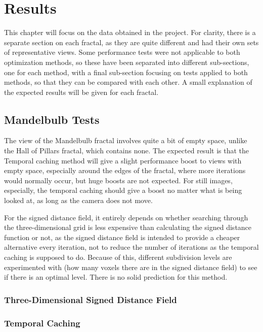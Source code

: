 \chapter{Results}
\label{chapter4}

This chapter will focus on the data obtained in the project. For clarity, there is a separate section on each fractal, as they are quite different and had their own sets of representative views. Some performance tests were not applicable to both optimization methods, so these have been separated into different sub-sections, one for each method, with a final sub-section focusing on tests applied to both methods, so that they can be compared with each other. A small explanation of the expected results will be given for each fractal.

\section{Mandelbulb Tests}

The view of the Mandelbulb fractal involves quite a bit of empty space, unlike the Hall of Pillars fractal, which contains none. The expected result is that the Temporal caching method will give a slight performance boost to views with empty space, especially around the edges of the fractal, where more iterations would normally occur, but huge boosts are not expected. For still images, especially, the temporal caching should give a boost no matter what is being looked at, as long as the camera does not move.\newline

For the signed distance field, it entirely depends on whether searching through the three-dimensional grid is less expensive than calculating the signed distance function or not, as the signed distance field is intended to provide a cheaper alternative every iteration, not to reduce the number of iterations as the temporal caching is supposed to do. Because of this, different subdivision levels are experimented with (how many voxels there are in the signed distance field) to see if there is an optimal level. There is no solid prediction for this method.

\subsection{Three-Dimensional Signed Distance Field}

\subsection{Temporal Caching}

